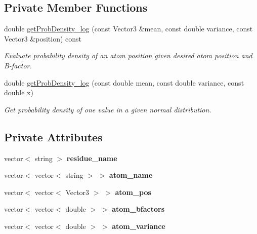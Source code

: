 \subsection*{Private Member Functions}
\begin{DoxyCompactItemize}
\item 
double \hyperlink{classBFactor_a5752e0293ab96b891b7516e478f78fc9}{get\-Prob\-Density\-\_\-log} (const Vector3 \&mean, const double variance, const Vector3 \&position) const 
\begin{DoxyCompactList}\small\item\em Evaluate probability density of an atom position given desired atom position and B-\/factor. \end{DoxyCompactList}\item 
double \hyperlink{classBFactor_ada2e7f58e349903d37ab14fe0de6a982}{get\-Prob\-Density\-\_\-log} (const double mean, const double variance, const double x)
\begin{DoxyCompactList}\small\item\em Get probability density of one value in a given normal distribution. \end{DoxyCompactList}\end{DoxyCompactItemize}
\subsection*{Private Attributes}
\begin{DoxyCompactItemize}
\item 
\hypertarget{classBFactor_adab76ed5a1c441b94c3e3551a305ec75}{vector$<$ string $>$ {\bfseries residue\-\_\-name}}\label{classBFactor_adab76ed5a1c441b94c3e3551a305ec75}

\item 
\hypertarget{classBFactor_af009183a1dd9d335e0398bd092b839af}{vector$<$ vector$<$ string $>$ $>$ {\bfseries atom\-\_\-name}}\label{classBFactor_af009183a1dd9d335e0398bd092b839af}

\item 
\hypertarget{classBFactor_ad80d6db61e218d8ca7072d70f8fdf518}{vector$<$ vector$<$ Vector3 $>$ $>$ {\bfseries atom\-\_\-pos}}\label{classBFactor_ad80d6db61e218d8ca7072d70f8fdf518}

\item 
\hypertarget{classBFactor_a1df76ff14c75494cc0da4310cd454146}{vector$<$ vector$<$ double $>$ $>$ {\bfseries atom\-\_\-bfactors}}\label{classBFactor_a1df76ff14c75494cc0da4310cd454146}

\item 
\hypertarget{classBFactor_a80956b6f7de1d29ea45eecba865f508e}{vector$<$ vector$<$ double $>$ $>$ {\bfseries atom\-\_\-variance}}\label{classBFactor_a80956b6f7de1d29ea45eecba865f508e}

\end{DoxyCompactItemize}


